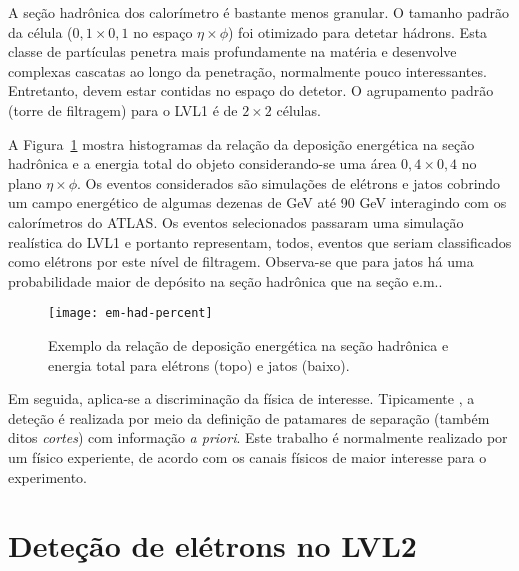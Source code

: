 A seção hadrônica dos calorímetro é bastante menos granular. O tamanho padrão
da célula ($0,1\times0,1$ no espaço $\eta\times\phi$) foi otimizado para
detetar hádrons. Esta classe de partículas penetra mais profundamente na
matéria e desenvolve complexas cascatas ao longo da penetração, normalmente
pouco interessantes. Entretanto, devem estar contidas no espaço do detetor. O
agrupamento padrão (torre de filtragem) para o LVL1 é de $2\times2$ células.

A Figura~\ref{fig:e-jet-deposit} mostra histogramas da relação da deposição
energética na seção hadrônica e a energia total do objeto considerando-se uma
área $0,4\times0,4$ no plano $\eta\times\phi$. Os eventos considerados são
simulações de elétrons e jatos cobrindo um campo energético de algumas dezenas
de GeV até 90 GeV interagindo com os calorímetros do ATLAS. Os eventos
selecionados passaram uma simulação realística do LVL1 e portanto representam,
todos, eventos que seriam classificados como elétrons por este nível de
filtragem. Observa-se que para jatos há uma probabilidade maior de depósito na
seção hadrônica que na seção e.m..

\begin{figure}
\begin{center}
\texttt{[image: em-had-percent]}
\end{center}
\caption{Exemplo da relação de deposição energética na seção hadrônica e
energia total para elétrons (topo) e jatos (baixo).}
\label{fig:e-jet-deposit}
\end{figure}

Em seguida, aplica-se a discriminação da física de interesse. Tipicamente
\cite{nevski-calor-1992, guida-calor-1992, palutan-calor-2000}, a deteção é
realizada por meio da definição de patamares de separação (também ditos
\emph{cortes}) com informação \emph{a priori}. Este trabalho é normalmente
realizado por um físico experiente, de acordo com os canais físicos de maior
interesse para o experimento.


\section{Deteção de elétrons no LVL2}
\label{sec:lvl2-detect-electron}

